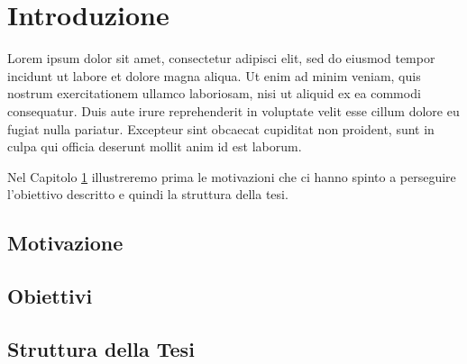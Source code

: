 \chapter{Introduzione}
\label{chap:intro}

Lorem ipsum dolor sit amet, consectetur adipisci elit, sed do eiusmod tempor incidunt ut labore et dolore magna aliqua. Ut enim ad minim veniam, quis nostrum exercitationem ullamco laboriosam, nisi ut aliquid ex ea commodi consequatur. Duis aute irure reprehenderit in voluptate velit esse cillum dolore eu fugiat nulla pariatur. Excepteur sint obcaecat cupiditat non proident, sunt in culpa qui officia deserunt mollit anim id est laborum.

Nel Capitolo \ref{chap:intro} illustreremo prima le motivazioni che ci hanno spinto a perseguire l'obiettivo descritto e quindi la struttura della tesi.

\section{Motivazione}
\section{Obiettivi}
\section{Struttura della Tesi}
